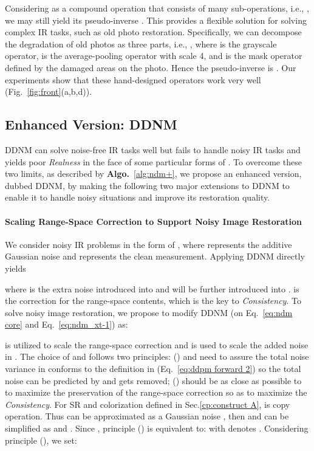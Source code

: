 \documentclass{article} \usepackage{iclr2023_conference,times}
\begin{document}
Considering  as a compound operation that consists of many sub-operations, i.e., , we may still yield its pseudo-inverse . This provides a flexible solution for solving complex IR tasks, such as old photo restoration. Specifically, we can decompose the degradation of old photos as three parts, i.e., , where  is the grayscale operator,  is the average-pooling operator with scale 4, and  is the mask operator defined by the damaged areas on the photo. Hence the pseudo-inverse is . Our experiments show that these hand-designed operators work very well (Fig.~\ref{fig:front}(a,b,d)).



\subsection{Enhanced Version: DDNM}
\label{cp:DDNM+}
DDNM can solve noise-free IR tasks well but fails to handle noisy IR tasks and yields poor \textit{Realness} in the face of some particular forms of . To overcome these two limits, as described by \textbf{Algo.}~\ref{alg:ndm+}, we propose an enhanced version, dubbed DDNM, by making the following two major extensions to DDNM to enable it to handle noisy situations and improve its restoration quality. 

\paragraph{Scaling Range-Space Correction to Support Noisy Image Restoration} We consider noisy IR problems in the form of , where  represents the additive Gaussian noise and  represents the clean measurement. Applying DDNM directly yields 

where  is the extra noise introduced into  and will be further introduced into .  is the correction for the range-space contents, which is the key to \textit{Consistency}. To solve noisy image restoration, we propose to modify DDNM (on Eq.~\ref{eq:ndm core} and Eq.~\ref{eq:ndm_xt-1}) as: 


 is utilized to scale the range-space correction  and   is used to scale the added noise  in . The choice of  and  follows two principles: ()  and  need to assure the total noise variance in  conforms to the definition in  (Eq.~\ref{eq:ddpm forward 2}) so the total noise can be predicted by  and gets removed; ()  should be as close as possible to  to maximize the preservation of the range-space correction  so as to maximize the \textit{Consistency}. For SR and colorization defined in Sec.\ref{cp:construct A},  is copy operation. Thus  can be approximated as a Gaussian noise , then  and  can be simplified as  and . Since , principle () is equivalent to:  with  denotes . Considering principle (), we set: 
\end{document}
